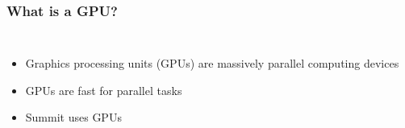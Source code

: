 \documentclass{beamer}
\begin{document}
\begin{frame}
\frametitle{What is a GPU?}

\begin{columns}
\begin{itemize}
\item Graphics processing units (GPUs) are massively parallel computing devices
\item GPUs are fast for parallel tasks
\item Summit uses GPUs
\end{itemize}


\end{columns}
\end{frame}
\end{document}
